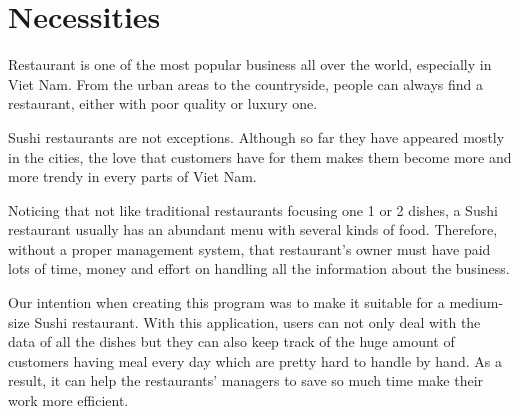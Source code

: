 \newpage
\section{Necessities}
\hspace{0.7cm}Restaurant is one of the most popular business all over the world, especially in Viet Nam. From the urban areas to the countryside, people can always find a restaurant, either with poor quality or luxury one. 

\vspace{0.7cm}
Sushi restaurants are not exceptions. Although so far they have appeared mostly in the cities, the love that customers have for them makes them become more and more trendy in every parts of Viet Nam.

\vspace{0.7cm}
Noticing that not like traditional restaurants focusing one 1 or 2 dishes, a Sushi restaurant usually has an abundant menu with several kinds of food. Therefore, without a proper management system, that restaurant’s owner must have paid lots of time, money and effort on handling all the information about the business. 

\vspace{0.7cm}
Our intention when creating this program was to make it suitable for a medium-size Sushi restaurant. With this application, users can not only deal with the data of all the dishes but they can also keep track of the huge amount of customers having meal every day which are pretty hard to handle by hand. As a result, it can help the restaurants’ managers to save so much time make their work more efficient.